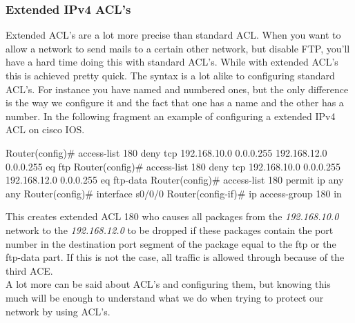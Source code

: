 \subsubsection{Extended IPv4 ACL's}
Extended ACL's are a lot more precise than standard ACL. When you want to allow a network to send mails to a certain other network, but disable FTP, you'll have a hard time doing this with standard ACL's. While with extended ACL's this is achieved pretty quick. The syntax is a lot alike to configuring standard ACL's. For instance you have named and numbered ones, but the only difference is the way we configure it and the fact that one has a name and the other has a number. In the following fragment an example of configuring a extended IPv4 ACL on cisco IOS.
\begin{cisco}[title=Numbered extended ACL]
Router(config)#  access-list 180 deny tcp 192.168.10.0 0.0.0.255 192.168.12.0 0.0.0.255 eq ftp
Router(config)#  access-list 180 deny tcp 192.168.10.0 0.0.0.255 192.168.12.0 0.0.0.255 eq ftp-data
Router(config)#  access-list 180 permit ip any any
Router(config)#  interface s0/0/0
Router(config-if)#  ip access-group 180 in
\end {cisco}
This creates extended ACL 180 who causes all packages from the \textit{192.168.10.0} network to the \textit{192.168.12.0} to be dropped if these packages contain the port number in the destination port segment of the package equal to the ftp or the ftp-data part. If this is not the case, all traffic is allowed through because of the third ACE.\\

A lot more can be said about ACL's and configuring them, but knowing this much will be enough to understand what we do when trying to protect our network by using ACL's.
